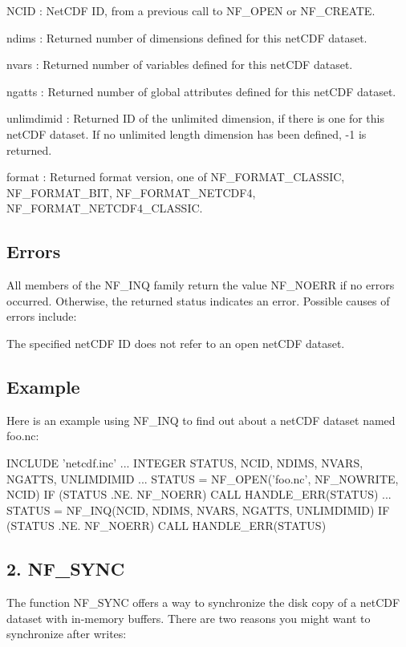 {\ttfamily N\+C\+ID} \+: Net\+C\+DF ID, from a previous call to N\+F\+\_\+\+O\+P\+EN or N\+F\+\_\+\+C\+R\+E\+A\+TE.

{\ttfamily ndims} \+: Returned number of dimensions defined for this net\+C\+DF dataset.

{\ttfamily nvars} \+: Returned number of variables defined for this net\+C\+DF dataset.

{\ttfamily ngatts} \+: Returned number of global attributes defined for this net\+C\+DF dataset.

{\ttfamily unlimdimid} \+: Returned ID of the unlimited dimension, if there is one for this net\+C\+DF dataset. If no unlimited length dimension has been defined, -\/1 is returned.

{\ttfamily format} \+: Returned format version, one of N\+F\+\_\+\+F\+O\+R\+M\+A\+T\+\_\+\+C\+L\+A\+S\+S\+IC, N\+F\+\_\+\+F\+O\+R\+M\+A\+T\+\_\+B\+IT, N\+F\+\_\+\+F\+O\+R\+M\+A\+T\+\_\+\+N\+E\+T\+C\+D\+F4, N\+F\+\_\+\+F\+O\+R\+M\+A\+T\+\_\+\+N\+E\+T\+C\+D\+F4\+\_\+\+C\+L\+A\+S\+S\+IC.

\subsection*{Errors }

All members of the N\+F\+\_\+\+I\+NQ family return the value N\+F\+\_\+\+N\+O\+E\+RR if no errors occurred. Otherwise, the returned status indicates an error. Possible causes of errors include\+:


\begin{DoxyItemize}
\item The specified net\+C\+DF ID does not refer to an open net\+C\+DF dataset.
\end{DoxyItemize}

\subsection*{Example }

Here is an example using N\+F\+\_\+\+I\+NQ to find out about a net\+C\+DF dataset named foo.\+nc\+:


\begin{DoxyCode}
INCLUDE 'netcdf.inc'
   ...
INTEGER STATUS, NCID, NDIMS, NVARS, NGATTS, UNLIMDIMID
   ...
STATUS = NF\_OPEN('foo.nc', NF\_NOWRITE, NCID)
IF (STATUS .NE. NF\_NOERR) CALL HANDLE\_ERR(STATUS)
   ...
STATUS = NF\_INQ(NCID, NDIMS, NVARS, NGATTS, UNLIMDIMID)
IF (STATUS .NE. NF\_NOERR) CALL HANDLE\_ERR(STATUS)
\end{DoxyCode}
\hypertarget{nc_f77_interface_guide_f77_NF-SYNC}{}\subsection{2. N\+F\+\_\+\+S\+Y\+N\+C }\label{nc_f77_interface_guide_f77_NF-SYNC}
The function N\+F\+\_\+\+S\+Y\+NC offers a way to synchronize the disk copy of a net\+C\+DF dataset with in-\/memory buffers. There are two reasons you might want to synchronize after writes\+:


